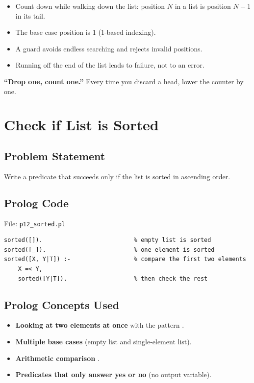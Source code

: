 \documentclass[11pt,a4paper]{article}
\newcommand{\pred}[1]{\texttt{\detokenize{#1}}}
\begin{document}
\begin{keybox}
\begin{itemize}[leftmargin=*]
  \item Count down while walking down the list: position $N$ in a list is position $N-1$ in its tail.
  \item The base case position is 1 (1-based indexing).
  \item A guard \pred{N > 1} avoids endless searching and rejects invalid positions.
  \item Running off the end of the list leads to failure, not to an error.
\end{itemize}
\end{keybox}
\begin{mnbox}
\textbf{``Drop one, count one.''} Every time you discard a head, lower the counter by one.
\end{mnbox}

\newpage
\section{Check if List is Sorted}
\setcounter{subsection}{0}
\subsection{Problem Statement}
Write a predicate \pred{sorted(List)} that succeeds only if the list is sorted in ascending order.

\subsection{Prolog Code}
File: \texttt{p12\_sorted.pl}
\begin{lstlisting}[style=pl]
sorted([]).                          % empty list is sorted
sorted([_]).                         % one element is sorted
sorted([X, Y|T]) :-                  % compare the first two elements
    X =< Y,
    sorted([Y|T]).                   % then check the rest
\end{lstlisting}

\subsection{Prolog Concepts Used}
\begin{itemize}[leftmargin=*]
  \item \textbf{Looking at two elements at once} with the pattern \pred{[X, Y|T]}.
  \item \textbf{Multiple base cases} (empty list and single-element list).
  \item \textbf{Arithmetic comparison} \pred{=<}.
  \item \textbf{Predicates that only answer yes or no} (no output variable).
\end{itemize}
\end{document}
